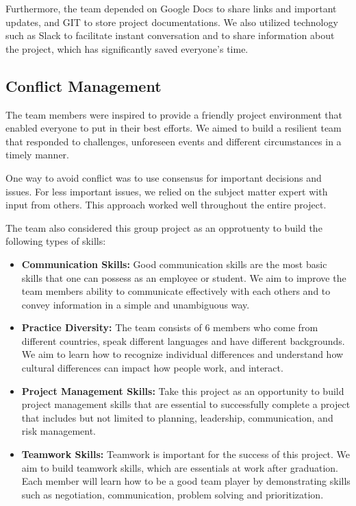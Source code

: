 \documentclass{article}
\begin{document}
Furthermore, the team depended on Google Docs to share links and important updates, and GIT to store project documentations. We also utilized technology such as Slack to facilitate instant conversation and to share information about the project, which has significantly saved everyone’s time.

\newline
\subsection{Conflict Management}
The team members were inspired to provide a friendly project environment that enabled everyone to put in their best efforts. We aimed to build a resilient team that responded to challenges, unforeseen events and different circumstances in a timely manner.

One way to avoid conflict was to use consensus for important decisions and issues. For less important issues, we relied on the subject matter expert with input from others. This approach worked well throughout the entire project.

\newline
\hfill \break %
The team also considered this group project as an opprotuenty to build the following types of skills:


\begin{itemize}
\item \textbf{Communication Skills:} Good communication skills are the most basic skills that one can possess as an employee or student. We aim to improve the team members ability to communicate effectively with each others and to convey information in a simple and unambiguous way.
\item \textbf{Practice Diversity:} The team consists of 6 members who come from different countries, speak different languages and have different backgrounds. We aim to learn how to recognize individual differences and understand how cultural differences can impact how people work, and interact.
\item \textbf{Project Management Skills:} Take this project as an opportunity to build project management skills that are essential to successfully complete a project that includes but not limited to planning, leadership, communication, and risk management.
\item \textbf{Teamwork Skills:} Teamwork is important for the success of this project. We aim to build teamwork skills, which are essentials at work after graduation. Each member will learn how to be a good team player by demonstrating skills such as negotiation, communication, problem solving and prioritization.
\end{itemize}
\end{document}
